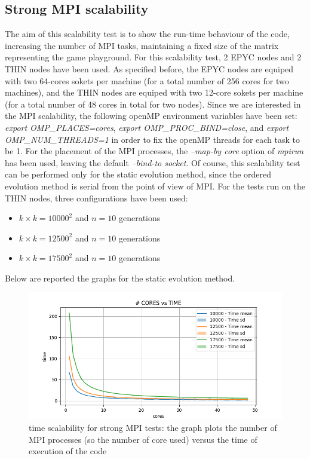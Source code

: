 \documentclass[12pt, titlepage]{report}
\begin{document}
\subsection{Strong MPI scalability}
The aim of this scalability test is to show the run-time behaviour of the code, increasing the number of MPI tasks, maintaining a fixed size of the matrix 
representing the game playground. For this scalability test, 2 EPYC nodes and 2 THIN nodes have been used. As specified before, the EPYC nodes are equiped with two 64-cores sokets per machine 
(for a total number of 256 cores for two machines), and the THIN nodes are equiped with two 12-core sokets per machine (for a total number of 48 cores in total for two nodes).
Since we are interested in the MPI scalability, the following openMP environment variables have been set: \emph{export OMP\_PLACES=cores}, 
\emph{export OMP\_PROC\_BIND=close}, and \emph{export OMP\_NUM\_THREADS=1} in order to fix the openMP threads for each task to be 1.
For the placement of the MPI processes, the \emph{--map-by core} option of \emph{mpirun} has been used, leaving the default \emph{--bind-to socket}.
Of course, this scalability test can be performed only for the static evolution method, since the ordered evolution method is serial from the point of 
view of MPI. For the tests run on the THIN nodes, three configurations have been used:
\begin{itemize}
	\item $k\times k = 10000^2$ and $n=10$ generations
	\item $k\times k = 12500^2$ and $n=10$ generations
	\item $k\times k = 17500^2$ and $n=10$ generations
\end{itemize}
Below are reported the graphs for the static evolution method.
\begin{figure}[H]
	\centering
	\includegraphics[width=\textwidth]{Assignment-1/MPI_strong-static-10000-10-THINtime.png}
	\caption{time scalability for strong MPI tests: the graph plots the number of MPI processes (so the number of core used) versus the time 
	of execution of the code}
\end{figure}
\end{document}
